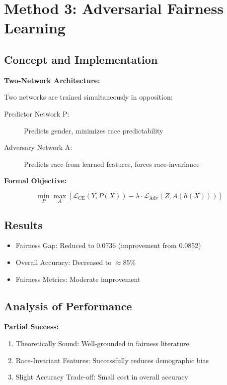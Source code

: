 \documentclass[11pt,a4paper]{report}
\begin{document}
\section{Method 3: Adversarial Fairness Learning}

\subsection{Concept and Implementation}

\textbf{Two-Network Architecture:}

Two networks are trained simultaneously in opposition:

\begin{description}
    \item[Predictor Network P:] Predicts gender, minimizes race predictability
    \item[Adversary Network A:] Predicts race from learned features, forces race-invariance
\end{description}

\textbf{Formal Objective:}

\begin{equation}
\min_P \max_A \left[ \mathcal{L}_{\text{CE}}(Y, P(X)) - \lambda \cdot \mathcal{L}_{\text{Adv}}(Z, A(h(X))) \right]
\end{equation}

\subsection{Results}

\begin{itemize}
    \item Fairness Gap: Reduced to 0.0736 (improvement from 0.0852)
    \item Overall Accuracy: Decreased to $\approx 85\%$
    \item Fairness Metrics: Moderate improvement
\end{itemize}

\subsection{Analysis of Performance}

\textbf{Partial Success:}
\begin{enumerate}
    \item Theoretically Sound: Well-grounded in fairness literature
    \item Race-Invariant Features: Successfully reduces demographic bias
    \item Slight Accuracy Trade-off: Small cost in overall accuracy
\end{enumerate}
\end{document}
